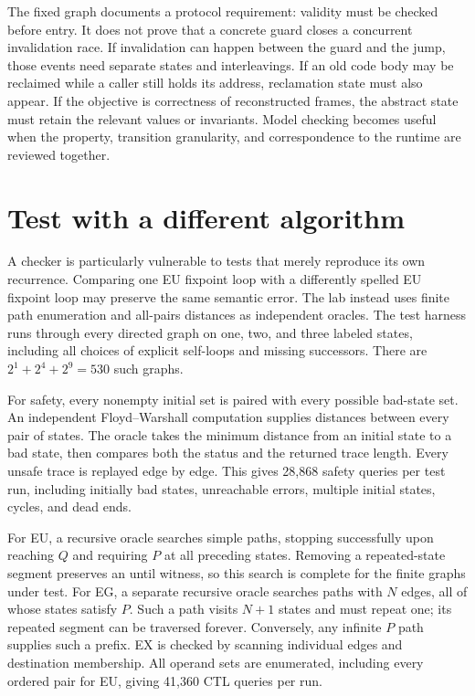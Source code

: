 The fixed graph documents a protocol requirement: validity must be checked before entry.
It does not prove that a concrete guard closes a concurrent invalidation race.
If invalidation can happen between the guard and the jump, those events need separate states and interleavings.
If an old code body may be reclaimed while a caller still holds its address, reclamation state must also appear.
If the objective is correctness of reconstructed frames, the abstract state must retain the relevant values or invariants.
Model checking becomes useful when the property, transition granularity, and correspondence to the runtime are reviewed together.

\section{Test with a different algorithm}
\label{sec:ch48-testing}

A checker is particularly vulnerable to tests that merely reproduce its own recurrence.
Comparing one EU fixpoint loop with a differently spelled EU fixpoint loop may preserve the same semantic error.
The lab instead uses finite path enumeration and all-pairs distances as independent oracles.
The test harness runs through every directed graph on one, two, and three labeled states, including all choices of explicit self-loops and missing successors.
There are $2^1+2^4+2^9=530$ such graphs.

For safety, every nonempty initial set is paired with every possible bad-state set.
An independent Floyd--Warshall computation supplies distances between every pair of states.
The oracle takes the minimum distance from an initial state to a bad state, then compares both the status and the returned trace length.
Every unsafe trace is replayed edge by edge.
This gives 28,868 safety queries per test run, including initially bad states, unreachable errors, multiple initial states, cycles, and dead ends.

For EU, a recursive oracle searches simple paths, stopping successfully upon reaching $Q$ and requiring $P$ at all preceding states.
Removing a repeated-state segment preserves an until witness, so this search is complete for the finite graphs under test.
For EG, a separate recursive oracle searches paths with $N$ edges, all of whose states satisfy $P$.
Such a path visits $N+1$ states and must repeat one; its repeated segment can be traversed forever.
Conversely, any infinite $P$ path supplies such a prefix.
EX is checked by scanning individual edges and destination membership.
All operand sets are enumerated, including every ordered pair for EU, giving 41,360 CTL queries per run.

